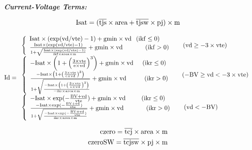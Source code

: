 \noindent\textbf{\textit{Current-Voltage Terms:}}


\[
\rm{Isat=(\overline{tjs}\times area+\overline{tjsw}\times pj)\times m}\nonumber
\]

\[
\rm{Id} =
\begin{array}{l l}
	\left\{
	\begin{array}{l l}	
	\rm{Isat\times(\exp(vd/vte)-1) + gmin\times vd\nonumber\hspace{0.1in}(ikf\leq 0)} \\
	\rm{\frac{Isat\times(\exp(vd/vte)-1)}{1+\sqrt{\frac{Isat\times(\exp(vd/vte)-1)}{ikf\times area\times m}}} + gmin\times vd\nonumber \hspace{0.5in}(ikf>0)}
	\end{array}
	\right.\nonumber \hspace{0.2in} \rm{(vd\geq-3\times vte)}\\
	\left\{
	\begin{array}{l l}	
	\rm{-Isat\times\left(1+\left(\frac{3\times vte}{e\times vd}\right)^3\right) + gmin\times vd\nonumber \hspace{0.2in}(ikr\leq 0)} \\
	\rm{\frac{-Isat\times\left(1+\left(\frac{3\times vte}{e\times vd}\right)^3\right)}{1+\sqrt{\frac{-Isat\times\left(1+\left(\frac{3\times vte}{e\times vd}\right)^3\right)}{-ikr\times area\times m}}} + gmin\times vd\nonumber \hspace{0.4in}(ikr>0)} 
	\end{array}
	\right.\nonumber \hspace{0.2in} \rm{(-BV \geq vd<-3\times vte)}\\	
	\left\{
	\begin{array}{l l}	
	\rm{-Isat\times\exp(-\frac{BV+vd}{vte}) + gmin\times vd\nonumber\hspace{0.35in}(ikr\leq 0)} \\
	\rm{\frac{-Isat\times\exp(-\frac{BV+vd}{vte})}{1+\sqrt{\frac{-Isat\times\exp(-\frac{BV+vd}{vte})}{ikr\times area\times m}}} + gmin\times vd\nonumber \hspace{0.5in}(ikr>0)}
	\end{array}
	\right.\nonumber \hspace{0.2in} \rm{(vd<-BV)}		
\end{array}
\]


\begin{eqnarray}
\rm{czero=\overline{tcj}\times area\times m}\nonumber\\
\rm{czeroSW=\overline{tcjsw}\times pj\times m}\nonumber
\end{eqnarray}

